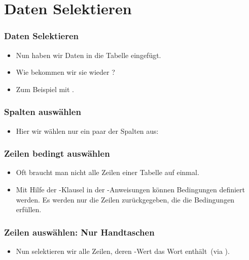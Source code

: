 \documentclass[aspectratio=169,mathserif,notheorems]{beamer}%
\begin{document}
\section{Daten Selektieren}%
%
\begin{frame}%
\frametitle{Daten Selektieren}%
\begin{itemize}%
\item Nun haben wir Daten in die Tabelle  eingefügt.%
\item<2-> Wie bekommen wir sie wieder ?%
\item<3-> Zum Beispiel mit .%
\end{itemize}%
\end{frame}%
%
%
\begin{frame}[t]
\frametitle{Spalten auswählen}%
\begin{itemize}%
\item Hier wir wählen nur ein paar der Spalten aus:%
\end{itemize}%
%
\end{frame}
%
%
\begin{frame}[t]
\frametitle{Zeilen bedingt auswählen}%
\begin{itemize}%
\item Oft braucht man nicht alle Zeilen einer Tabelle auf einmal.%
\item<2-> Mit Hilfe der -Klausel in der -Anweisungen können Bedingungen definiert werden. Es werden nur die Zeilen zurückgegeben, die die Bedingungen erfüllen.%
\end{itemize}%
%
\end{frame}
%
%
\begin{frame}[t]
\frametitle{Zeilen auswählen: Nur Handtaschen}%
\begin{itemize}%
\item Nun selektieren wir alle Zeilen, deren -Wert das Wort  enthält~(via \cite{PGDG:PD:PM}).%
\end{itemize}%
%
\end{frame}
\end{document}
